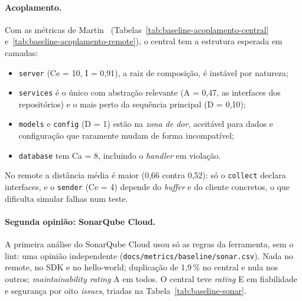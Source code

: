 \paragraph{Acoplamento.}
Com as métricas de Martin~\cite{martin2002} (Tabelas~\ref{tab:baseline-acoplamento-central}
e~\ref{tab:baseline-acoplamento-remote}), o central tem a estrutura esperada em camadas:
\begin{itemize}
  \item \texttt{server} (Ce = 10, I = 0,91), a raiz de composição, é instável por natureza;
  \item \texttt{services} é o único com abstração relevante (A = 0,47, as interfaces dos repositórios) e o mais
        perto da sequência principal (D = 0,10);
  \item \texttt{models} e \texttt{config} (D = 1) estão na \emph{zona de dor}, aceitável para dados e configuração
        que raramente mudam de forma incompatível;
  \item \texttt{database} tem Ca = 8, incluindo o \emph{handler} em violação.
\end{itemize}
No remote a distância média é maior (0,66 contra 0,52): só o \texttt{collect} declara interfaces, e o
\texttt{sender} (Ce = 4) depende do \emph{buffer} e do cliente concretos, o que dificulta simular falhas num teste.


\paragraph{Segunda opinião: SonarQube Cloud.}
A primeira análise do SonarQube Cloud usou só as regras da ferramenta, sem o lint: uma opinião independente
(\texttt{docs/metrics/baseline/sonar.csv}). Nada no remote, no SDK e no hello-world; duplicação de 1,9\,\% no central
e nula nos outros; \emph{maintainability rating} A em todos. O central teve \emph{rating} E em fiabilidade e
segurança por oito \emph{issues}, triadas na Tabela~\ref{tab:baseline-sonar}.

